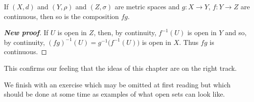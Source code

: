 \begin{theorem}\label{New proof composition}
If $(X,d)$ and $(Y,\rho)$
and $(Z,\sigma)$ are metric spaces and $g:X\rightarrow Y$, $f:Y\rightarrow Z$
are continuous,
then so is the composition $fg$.
\end{theorem}
\begin{proof}[\bf New proof] If $U$ is open in $Z$, then, by continuity, $f^{-1}(U)$ is open in $Y$ and so, by continuity, $(fg)^{-1}(U)=g^{-1}\big(f^{-1}(U)\big)$ is open in $X$. Thus $fg$ is continuous.
\end{proof}

This confirms our feeling that the ideas of this chapter
are on the right track.

We finish with an exercise which may be omitted
at first reading but which should be done at some time
as examples of what open sets can look like.





